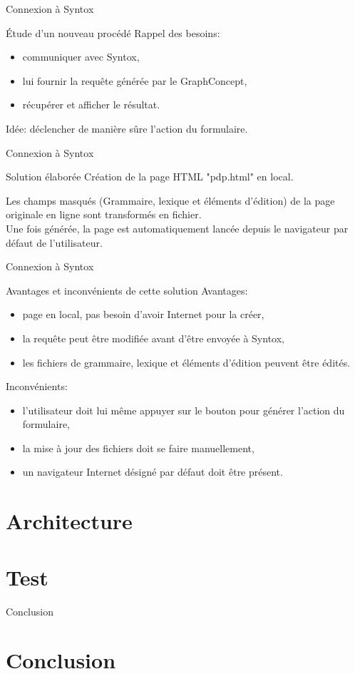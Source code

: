 \documentclass[8pt]{beamer}
\begin{document}
\begin{frame}{Connexion à Syntox}
\begin{block}{Étude d'un nouveau procédé}
Rappel des besoins:
\begin{itemize}
\item communiquer avec Syntox,
\item lui fournir la requête générée par le GraphConcept,
\item récupérer et afficher le résultat.
\end{itemize}
Idée: déclencher de manière sûre l'action du formulaire. 
\end{block}
\end{frame}

\begin{frame}{Connexion à Syntox}
\begin{block}{Solution élaborée}
Création de la page HTML "pdp.html" en local.
\begin{center}
\end{center}
Les champs masqués (Grammaire, lexique et éléments d'édition) de la page originale en ligne sont transformés en fichier.
\\ Une fois générée, la page est automatiquement lancée depuis le navigateur par défaut de l'utilisateur.
\end{block}
\end{frame}

\begin{frame}{Connexion à Syntox}
\begin{block}{Avantages et inconvénients de cette solution}
Avantages:
\begin{itemize}
\item page en local, pas besoin d'avoir Internet pour la créer,
\item la requête peut être modifiée avant d'être envoyée à Syntox,
\item les fichiers de grammaire, lexique et éléments d'édition peuvent être édités.
\end{itemize}
Inconvénients:
\begin{itemize}
\item l'utilisateur doit lui même appuyer sur le bouton pour générer l'action du formulaire,
\item la mise à jour des fichiers doit se faire manuellement,
\item un navigateur Internet désigné par défaut doit être présent.
\end{itemize}
\end{block}
\end{frame}

\section{Architecture}



\section{Test}
\begin{frame}
\end{frame}


\begin{frame}{Conclusion}
\section*{Conclusion}
\end{frame}
\end{document}
